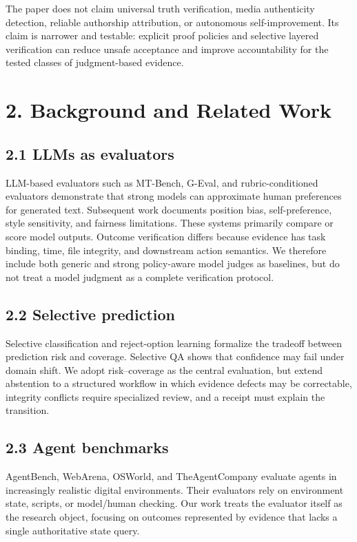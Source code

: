 \documentclass[11pt]{article}
\begin{document}
The paper does not claim universal truth verification, media authenticity detection, reliable authorship attribution, or autonomous self-improvement. Its claim is narrower and testable: explicit proof policies and selective layered verification can reduce unsafe acceptance and improve accountability for the tested classes of judgment-based evidence.\par

\section{2. Background and Related Work}

\subsection{2.1 LLMs as evaluators}

LLM-based evaluators such as MT-Bench, G-Eval, and rubric-conditioned evaluators demonstrate that strong models can approximate human preferences for generated text. Subsequent work documents position bias, self-preference, style sensitivity, and fairness limitations. These systems primarily compare or score model outputs. Outcome verification differs because evidence has task binding, time, file integrity, and downstream action semantics. We therefore include both generic and strong policy-aware model judges as baselines, but do not treat a model judgment as a complete verification protocol.\par

\subsection{2.2 Selective prediction}

Selective classification and reject-option learning formalize the tradeoff between prediction risk and coverage. Selective QA shows that confidence may fail under domain shift. We adopt risk--coverage as the central evaluation, but extend abstention to a structured workflow in which evidence defects may be correctable, integrity conflicts require specialized review, and a receipt must explain the transition.\par

\subsection{2.3 Agent benchmarks}

AgentBench, WebArena, OSWorld, and TheAgentCompany evaluate agents in increasingly realistic digital environments. Their evaluators rely on environment state, scripts, or model/human checking. Our work treats the evaluator itself as the research object, focusing on outcomes represented by evidence that lacks a single authoritative state query.\par
\end{document}
